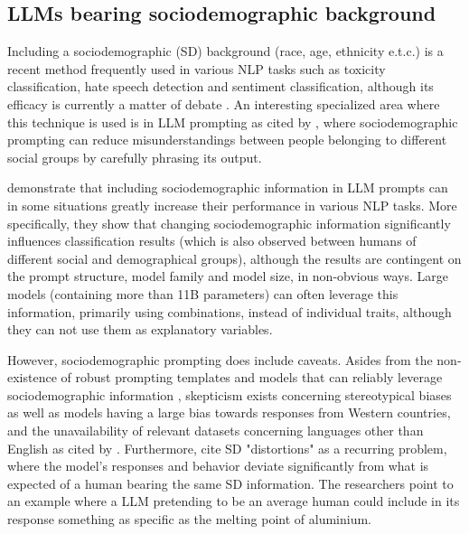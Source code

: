 \subsection{LLMs bearing sociodemographic background}
\label{sec:related:sociodemographic}

Including a sociodemographic (SD) background (race, age, ethnicity e.t.c.) is a recent method frequently used in various NLP tasks such as toxicity classification, hate speech detection and sentiment classification, although its efficacy is currently a matter of debate \cite{beck-etal-2024-sensitivity}. An interesting specialized area where this technique is used is in LLM prompting \cite{hwang-etal-2023-aligning, durmus2024measuringrepresentationsubjectiveglobal} as cited by \cite{beck-etal-2024-sensitivity}, where sociodemographic prompting can reduce misunderstandings between people belonging to different social groups by carefully phrasing its output.  %

\cite{beck-etal-2024-sensitivity} demonstrate that including sociodemographic information in LLM prompts can in some situations greatly increase their performance in various NLP tasks. More specifically, they show that changing sociodemographic information significantly influences classification results (which is also observed between humans of different social and demographical groups), although the results are contingent on the prompt structure, model family and model size, in non-obvious ways. Large models (containing more than 11B parameters) can often leverage this information, primarily using combinations, instead of individual traits, although they can not use them as explanatory variables.

However, sociodemographic prompting does include caveats. Asides from the non-existence of robust prompting templates and models that can reliably leverage sociodemographic information \cite{beck-etal-2024-sensitivity}, skepticism exists concerning stereotypical biases \cite{cheng-etal-2023-marked, deshpande-etal-2023-toxicity} as well as models having a large bias towards responses from Western countries, and the unavailability of relevant datasets concerning languages other than English \cite{pmlr-v202-santurkar23a, durmus2024measuringrepresentationsubjectiveglobal, santy-etal-2023-nlpositionality} as cited by \cite{beck-etal-2024-sensitivity}. Furthermore, \cite{aher2023usinglargelanguagemodels} cite SD "distortions" as a recurring problem, where the model's responses and behavior deviate significantly from what is expected of a human bearing the same SD information. The researchers point to an example where a LLM pretending to be an average human could include in its response something as specific as the melting point of aluminium.

